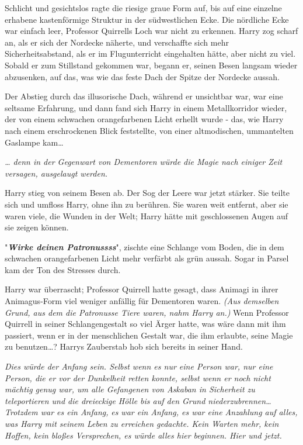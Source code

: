 {Schlicht und gesichtslos ragte die riesige graue Form auf, bis auf eine einzelne erhabene kastenförmige Struktur in der südwestlichen Ecke. Die nördliche Ecke war einfach leer, Professor Quirrells Loch war nicht zu erkennen. Harry zog scharf an, als er sich der Nordecke näherte, und verschaffte sich mehr Sicherheitsabstand, als er im Flugunterricht eingehalten hätte, aber nicht zu viel. Sobald er zum Stillstand gekommen war, begann er, seinen Besen langsam wieder abzusenken, auf das, was wie das feste Dach der Spitze der Nordecke aussah.

Der Abstieg durch das illusorische Dach, während er unsichtbar war, war eine seltsame Erfahrung, und dann fand sich Harry in einem Metallkorridor wieder, der von einem schwachen orangefarbenen Licht erhellt wurde - das, wie Harry nach einem erschrockenen Blick feststellte, von einer altmodischen, ummantelten Gaslampe kam…

\emph{… denn in der Gegenwart von Dementoren würde die Magie nach einiger Zeit versagen, ausgelaugt werden.}

Harry stieg von seinem Besen ab. Der Sog der Leere war jetzt stärker. Sie teilte sich und umfloss Harry, ohne ihn zu berühren. Sie waren weit entfernt, aber sie waren viele, die Wunden in der Welt; Harry hätte mit geschlossenen Augen auf sie zeigen können.

"\textbf{\emph{Wirke deinen Patronussss}}", zischte eine Schlange vom Boden, die in dem schwachen orangefarbenen Licht mehr verfärbt als grün aussah. Sogar in Parsel kam der Ton des Stresses durch.

Harry war überrascht; Professor Quirrell hatte gesagt, dass Animagi in ihrer Animagus-Form viel weniger anfällig für Dementoren waren. \emph{(Aus demselben Grund, aus dem die Patronusse Tiere waren, nahm Harry an.)} Wenn Professor Quirrell in seiner Schlangengestalt so viel Ärger hatte, was wäre dann mit ihm passiert, wenn er in der menschlichen Gestalt war, die ihm erlaubte, seine Magie zu benutzen…? Harrys Zauberstab hob sich bereits in seiner Hand.

\emph{Dies würde der Anfang sein. Selbst wenn es nur eine Person war, nur eine Person, die er vor der Dunkelheit retten konnte, selbst wenn er noch nicht mächtig genug war, um alle Gefangenen von Askaban in Sicherheit zu teleportieren und die dreieckige Hölle bis auf den Grund niederzubrennen… Trotzdem war es ein Anfang,} \emph{es war ein Anfang, es war eine Anzahlung auf alles, was Harry mit seinem Leben zu erreichen gedachte. Kein Warten mehr, kein Hoffen, kein bloßes Versprechen, es würde alles hier beginnen. Hier und jetzt.}

}
